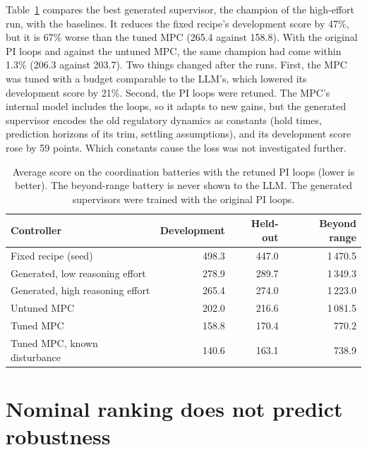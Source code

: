 Table~\ref{tab:coord-main} compares the best generated supervisor, the
champion of the high-effort run, with the baselines. It reduces the fixed
recipe's development score by 47\%, but it is 67\% worse than the tuned MPC
(265.4 against 158.8). With the original PI loops and against the untuned
MPC, the same champion had come within 1.3\% (206.3 against 203.7). Two
things changed after the runs. First, the MPC was tuned with a budget
comparable to the LLM's, which lowered its development score by 21\%. Second,
the PI loops were retuned. The MPC's internal model includes the loops, so it
adapts to new gains, but the generated supervisor encodes the old regulatory
dynamics as constants (hold times, prediction horizons of its trim, settling
assumptions), and its development score rose by 59 points. Which constants
cause the loss was not investigated further.

\begin{table}[tb]
  \centering
  \caption{Average score on the coordination batteries with the retuned PI
    loops (lower is better). The beyond-range battery is never shown to the
    LLM. The generated supervisors were trained with the original PI loops.}
  \label{tab:coord-main}
  \begin{tabular}{@{}lrrr@{}}
    \toprule
    Controller & Development & Held-out & Beyond range \\
    \midrule
    Fixed recipe (seed)                 & 498.3 & 447.0 & 1\,470.5 \\
    Generated, low reasoning effort     & 278.9 & 289.7 & 1\,349.3 \\
    Generated, high reasoning effort    & 265.4 & 274.0 & 1\,223.0 \\
    Untuned MPC                         & 202.0 & 216.6 & 1\,081.5 \\
    Tuned MPC                           & 158.8 & 170.4 &    770.2 \\
    Tuned MPC, known disturbance        & 140.6 & 163.1 &    738.9 \\
    \bottomrule
  \end{tabular}
\end{table}

\section{Nominal ranking does not predict robustness}
\label{sec:tank-robustness}

